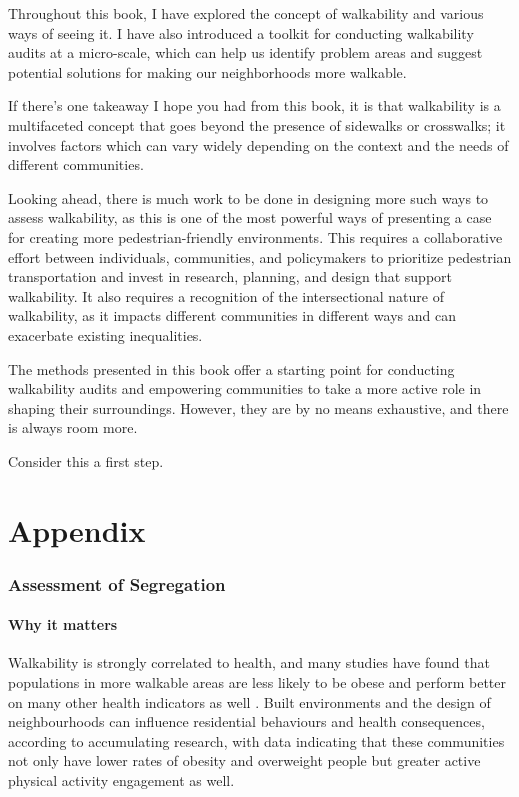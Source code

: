 \documentclass[
]{latex/krantz}
\begin{document}
Throughout this book, I have explored the concept of walkability and various ways of seeing it. I have also introduced a toolkit for conducting walkability audits at a micro-scale, which can help us identify problem areas and suggest potential solutions for making our neighborhoods more walkable.

If there's one takeaway I hope you had from this book, it is that walkability is a multifaceted concept that goes beyond the presence of sidewalks or crosswalks; it involves factors which can vary widely depending on the context and the needs of different communities.

Looking ahead, there is much work to be done in designing more such ways to assess walkability, as this is one of the most powerful ways of presenting a case for creating more pedestrian-friendly environments. This requires a collaborative effort between individuals, communities, and policymakers to prioritize pedestrian transportation and invest in research, planning, and design that support walkability. It also requires a recognition of the intersectional nature of walkability, as it impacts different communities in different ways and can exacerbate existing inequalities.

The methods presented in this book offer a starting point for conducting walkability audits and empowering communities to take a more active role in shaping their surroundings. However, they are by no means exhaustive, and there is always room more.

Consider this a first step.

\hypertarget{part-appendix}{%
\part{Appendix}\label{part-appendix}}

\hypertarget{assessment-of-segregation}{%
\section{Assessment of Segregation}\label{assessment-of-segregation}}

\hypertarget{why-it-matters}{%
\subsection{Why it matters}\label{why-it-matters}}

Walkability is strongly correlated to health, and many studies have found that populations in more walkable areas are less likely to be obese \autocite{riggsInclusivelyWalkableExploring2016} and perform better on many other health indicators as well \autocite{suCommunityDeprivationWalkability2017}. Built environments and the design of neighbourhoods can influence residential behaviours and health consequences, according to accumulating research, with data indicating that these communities not only have lower rates of obesity and overweight people but greater active physical activity engagement as well.
\end{document}
